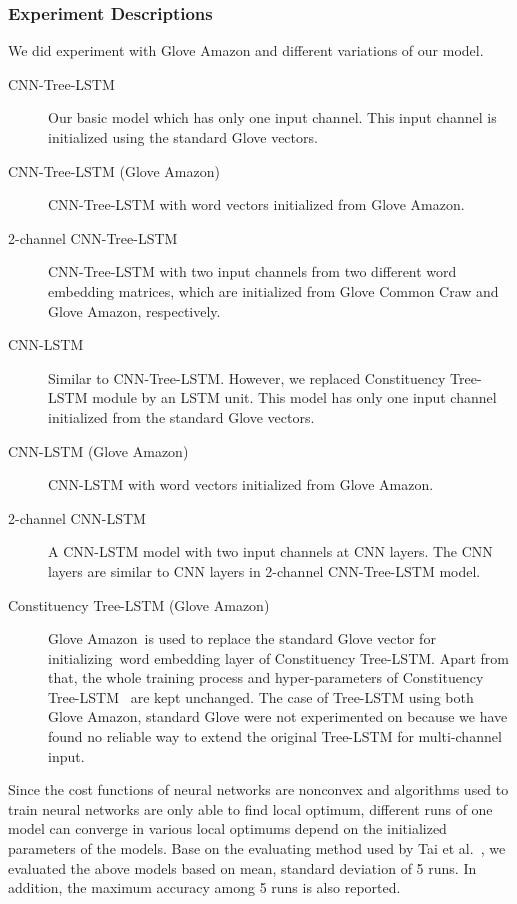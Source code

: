 \subsubsection{Experiment Descriptions}
We did experiment with Glove Amazon and different variations of our model.
\begin{description}
	\item[CNN-Tree-LSTM] Our basic model which has only one input channel.
	This input channel is initialized using the standard Glove vectors.
	\item[CNN-Tree-LSTM (Glove Amazon)] CNN-Tree-LSTM with word vectors initialized from Glove Amazon.
	\item [2-channel CNN-Tree-LSTM] CNN-Tree-LSTM with two input channels from two different word embedding matrices, which are initialized from Glove Common Craw and Glove Amazon, respectively.
	\item[CNN-LSTM] Similar to CNN-Tree-LSTM. However, we replaced Constituency Tree-LSTM module by an LSTM unit.
	This model has only one input channel initialized from the standard Glove vectors.
	\item [CNN-LSTM (Glove Amazon)] CNN-LSTM with word vectors initialized from Glove Amazon.
	\item [2-channel CNN-LSTM] A CNN-LSTM model with two input channels at CNN layers. The CNN layers are similar to CNN layers in 2-channel CNN-Tree-LSTM model.
	\item[Constituency Tree-LSTM (Glove Amazon)]Glove Amazon~is used to replace the standard Glove vector for initializing~word embedding layer of Constituency Tree-LSTM.
	Apart from that, the whole training process and hyper-parameters of Constituency Tree-LSTM~\cite{treeLSTM} are kept unchanged.
	The case of Tree-LSTM using both Glove Amazon, standard Glove were not experimented on because we have found no reliable way to extend the original Tree-LSTM for multi-channel input.
\end{description}

Since the cost functions of neural networks are nonconvex and algorithms used to train neural networks are only able to find local optimum, different runs of one model can converge in various local optimums depend on the initialized parameters of the models.
Base on the evaluating method used by Tai et al.~\cite{treeLSTM}, we evaluated the above models based on mean, standard deviation of 5 runs.
In addition, the maximum accuracy among 5 runs is also reported.

